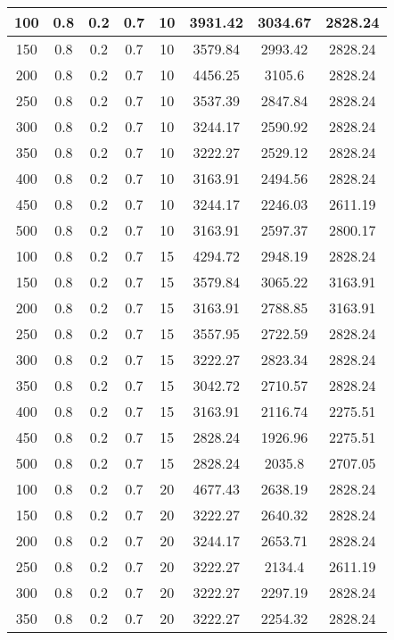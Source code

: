 \documentclass[a4paper, 12pt]{extreport}
\begin{document}
\begin{itemize}
\begin{longtable}{|c|c|c|c|c|c|c|c|}
			100 & 0.8 & 0.2 & 0.7 & 10 & 3931.42 & 3034.67 & 2828.24 \\\hline
			150 & 0.8 & 0.2 & 0.7 & 10 & 3579.84 & 2993.42 & 2828.24 \\\hline
			200 & 0.8 & 0.2 & 0.7 & 10 & 4456.25 & 3105.6 & 2828.24 \\\hline
			250 & 0.8 & 0.2 & 0.7 & 10 & 3537.39 & 2847.84 & 2828.24 \\\hline
			300 & 0.8 & 0.2 & 0.7 & 10 & 3244.17 & 2590.92 & 2828.24 \\\hline
			350 & 0.8 & 0.2 & 0.7 & 10 & 3222.27 & 2529.12 & 2828.24 \\\hline
			400 & 0.8 & 0.2 & 0.7 & 10 & 3163.91 & 2494.56 & 2828.24 \\\hline
			450 & 0.8 & 0.2 & 0.7 & 10 & 3244.17 & 2246.03 & 2611.19 \\\hline
			500 & 0.8 & 0.2 & 0.7 & 10 & 3163.91 & 2597.37 & 2800.17 \\\hline
			100 & 0.8 & 0.2 & 0.7 & 15 & 4294.72 & 2948.19 & 2828.24 \\\hline
			150 & 0.8 & 0.2 & 0.7 & 15 & 3579.84 & 3065.22 & 3163.91 \\\hline
			200 & 0.8 & 0.2 & 0.7 & 15 & 3163.91 & 2788.85 & 3163.91 \\\hline
			250 & 0.8 & 0.2 & 0.7 & 15 & 3557.95 & 2722.59 & 2828.24 \\\hline
			300 & 0.8 & 0.2 & 0.7 & 15 & 3222.27 & 2823.34 & 2828.24 \\\hline
			350 & 0.8 & 0.2 & 0.7 & 15 & 3042.72 & 2710.57 & 2828.24 \\\hline
			400 & 0.8 & 0.2 & 0.7 & 15 & 3163.91 & 2116.74 & 2275.51 \\\hline
			450 & 0.8 & 0.2 & 0.7 & 15 & 2828.24 & 1926.96 & 2275.51 \\\hline
			500 & 0.8 & 0.2 & 0.7 & 15 & 2828.24 & 2035.8 & 2707.05 \\\hline
			100 & 0.8 & 0.2 & 0.7 & 20 & 4677.43 & 2638.19 & 2828.24 \\\hline
			150 & 0.8 & 0.2 & 0.7 & 20 & 3222.27 & 2640.32 & 2828.24 \\\hline
			200 & 0.8 & 0.2 & 0.7 & 20 & 3244.17 & 2653.71 & 2828.24 \\\hline
			250 & 0.8 & 0.2 & 0.7 & 20 & 3222.27 & 2134.4 & 2611.19 \\\hline
			300 & 0.8 & 0.2 & 0.7 & 20 & 3222.27 & 2297.19 & 2828.24 \\\hline
			350 & 0.8 & 0.2 & 0.7 & 20 & 3222.27 & 2254.32 & 2828.24 \\\hline

\end{longtable}
\end{itemize}
\end{document}
